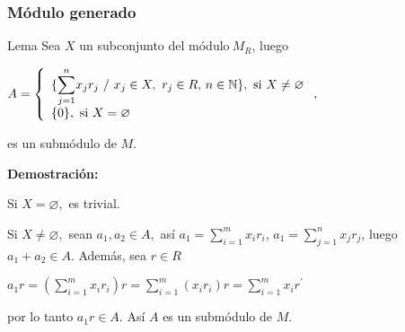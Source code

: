 \documentclass[notes=show]{beamer}%
\providecommand{\U}[1]{\protect\rule{.1in}{.1in}}
\newenvironment{Lema}{\begin{block}{Lema}}{\end{block}}
\begin{document}
\begin{frame}%


\bigskip%
\frametitle{Módulo generado}%


\begin{Lema}
Sea $X$ un subconjunto del módulo$\ M_{R}$, luego

$A=\left\{
\begin{array}
[c]{l}%
\{%
{\displaystyle\sum\limits_{j=1}^{n}}
x_{j}r_{j}\text{ }/\text{ }x_{j}\in X,\text{ }r_{j}\in R\text{, }n\in%
\mathbb{N}
\},\text{ si }X\neq\varnothing\\
\{0\},\text{ si }X=\varnothing
\end{array}
\right.  ,$

es un submódulo de $M$.
\end{Lema}

\textbf{Demostración:}

Si $X=\varnothing,$ es trivial.

Si $X\neq\varnothing,$ sean $a_{1},a_{2}\in A,$ así $a_{1}=%
{\displaystyle\sum\limits_{i=1}^{m}}
x_{i}r_{i}$, $a_{1}=%
{\displaystyle\sum\limits_{j=1}^{n}}
x_{j}r_{j}$, luego $a_{1}+a_{2}\in A.$ Además, sea $r\in R$

$a_{1}r=(%
{\displaystyle\sum\limits_{i=1}^{m}}
x_{i}r_{i})r=%
{\displaystyle\sum\limits_{i=1}^{m}}
(x_{i}r_{i})r=%
{\displaystyle\sum\limits_{i=1}^{m}}
x_{i}r^{\prime}$

\bigskip

por lo tanto $a_{1}r\in A$. Así $A$ es un submódulo de $M$.\bigskip

\bigskip%

\transboxout
\end{frame}%
\end{document}
